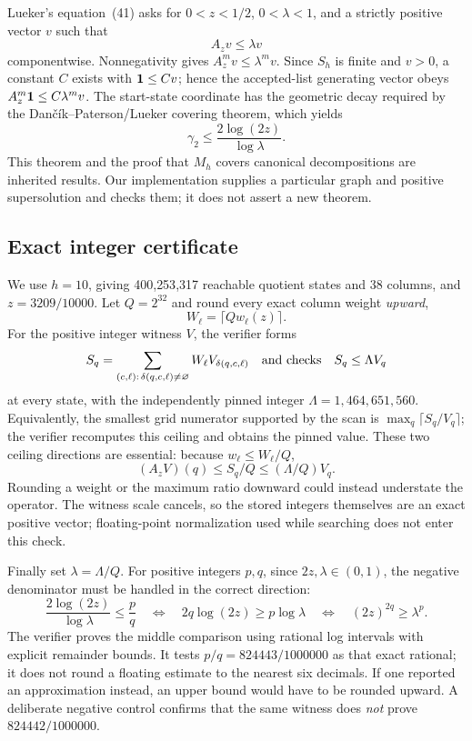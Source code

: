 \documentclass[11pt]{article}
\theoremstyle{plain}
\begin{document}
Lueker's equation~(41) asks for $0<z<1/2$, $0<\lambda<1$, and a strictly positive vector $v$ such that
\[
 A_zv\leq\lambda v
\]
componentwise. Nonnegativity gives $A_z^m v\leq\lambda^m v$. Since $S_h$ is finite and $v>0$, a constant $C$ exists with ${\bf1}\leq Cv$; hence the accepted-list generating vector obeys $A_z^m{\bf1}\leq C\lambda^m v$. The start-state coordinate has the geometric decay required by the Dan\v{c}\'ik--Paterson/Lueker covering theorem, which yields
\[
 \gamma_2\leq\frac{2\log(2z)}{\log\lambda}.
\]
This theorem and the proof that $M_h$ covers canonical decompositions are inherited results. Our implementation supplies a particular graph and positive supersolution and checks them; it does not assert a new theorem.

\subsection{Exact integer certificate}

We use $h=10$, giving 400{,}253{,}317 reachable quotient states and 38 columns, and $z=3209/10000$. Let $Q=2^{32}$ and round every exact column weight \emph{upward},
\[
 W_\ell=\lceil Qw_\ell(z)\rceil.
\]
For the positive integer witness $V$, the verifier forms
\[
 S_q=\sum_{(c,\ell):\,\delta(q,c,\ell)\ne\varnothing}
 W_\ell V_{\delta(q,c,\ell)}
\quad\hbox{and checks}\quad
 S_q\leq\Lambda V_q
\]
at every state, with the independently pinned integer $\Lambda=1{,}464{,}651{,}560$. Equivalently, the smallest grid numerator supported by the scan is $\max_q\lceil S_q/V_q\rceil$; the verifier recomputes this ceiling and obtains the pinned value. These two ceiling directions are essential: because $w_\ell\leq W_\ell/Q$,
\[
 (A_zV)(q)\leq S_q/Q\leq(\Lambda/Q)V_q.
\]
Rounding a weight or the maximum ratio downward could instead understate the operator. The witness scale cancels, so the stored integers themselves are an exact positive vector; floating-point normalization used while searching does not enter this check.

Finally set $\lambda=\Lambda/Q$. For positive integers $p,q$, since $2z,\lambda\in(0,1)$, the negative denominator must be handled in the correct direction:
\[
 \frac{2\log(2z)}{\log\lambda}\leq\frac pq
 \quad\Longleftrightarrow\quad
 2q\log(2z)\geq p\log\lambda
 \quad\Longleftrightarrow\quad
 (2z)^{2q}\geq\lambda^p.
\]
The verifier proves the middle comparison using rational log intervals with explicit remainder bounds. It tests $p/q=824443/1000000$ as that exact rational; it does not round a floating estimate to the nearest six decimals. If one reported an approximation instead, an upper bound would have to be rounded upward. A deliberate negative control confirms that the same witness does \emph{not} prove $824442/1000000$.
\end{document}
